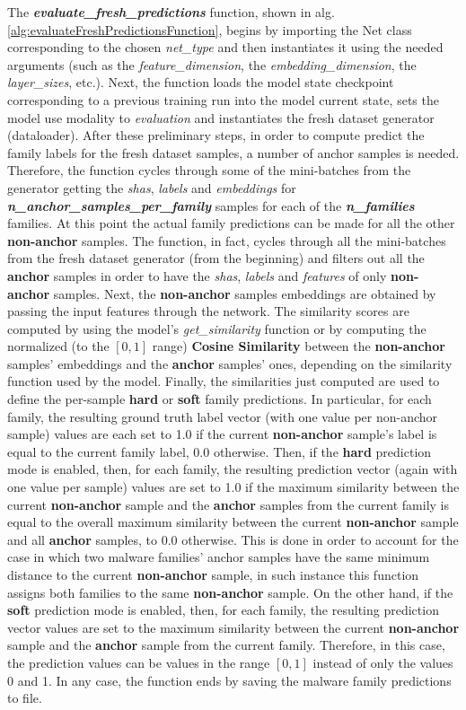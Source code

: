 \documentclass[pdfa%
,cucitura%
]{toptesi}
\begin{document}
The \textbf{\textit{evaluate\_fresh\_predictions}} function, shown in alg. \ref{alg:evaluateFreshPredictionsFunction}, begins by importing the Net class corresponding to the chosen \textit{net\_type} and then instantiates it using the needed arguments (such as the \textit{feature\_dimension}, the \textit{embedding\_dimension}, the \textit{layer\_sizes}, etc.). Next, the function loads the model state checkpoint corresponding to a previous training run into the model current state, sets the model use modality to \textit{evaluation} and instantiates the fresh dataset generator (dataloader). After these preliminary steps, in order to compute predict the family labels for the fresh dataset samples, a number of anchor samples is needed. Therefore, the function cycles through some of the mini-batches from the generator getting the \textit{shas}, \textit{labels} and \textit{embeddings} for \textbf{\textit{n\_anchor\_samples\_per\_family}} samples for each of the \textbf{\textit{n\_families}} families. At this point the actual family predictions can be made for all the other \textbf{non-anchor} samples. The function, in fact, cycles through all the mini-batches from the fresh dataset generator (from the beginning) and filters out all the \textbf{anchor} samples in order to have the \textit{shas}, \textit{labels} and \textit{features} of only \textbf{non-anchor} samples. Next, the \textbf{non-anchor} samples embeddings are obtained by passing the input features through the network. The similarity scores are computed by using the model's \textit{get\_similarity} function or by computing the normalized (to the $[0,1]$ range) \textbf{Cosine Similarity} between the \textbf{non-anchor} samples' embeddings and the \textbf{anchor} samples' ones, depending on the similarity function used by the model. Finally, the similarities just computed are used to define the per-sample \textbf{hard} or \textbf{soft} family predictions. In particular, for each family, the resulting ground truth label vector (with one value per non-anchor sample) values are each set to 1.0 if the current \textbf{non-anchor} sample's label is equal to the current family label, 0.0 otherwise. Then, if the \textbf{hard} prediction mode is enabled, then, for each family, the resulting prediction vector (again with one value per sample) values are set to 1.0 if the maximum similarity between the current \textbf{non-anchor} sample and the \textbf{anchor} samples from the current family is equal to the overall maximum similarity between the current \textbf{non-anchor} sample and all \textbf{anchor} samples, to 0.0 otherwise. This is done in order to account for the case in which two malware families' anchor samples have the same minimum distance to the current \textbf{non-anchor} sample, in such instance this function assigns both families to the same \textbf{non-anchor} sample. On the other hand, if the \textbf{soft} prediction mode is enabled, then, for each family, the resulting prediction vector values are set to the maximum similarity between the current \textbf{non-anchor} sample and the \textbf{anchor} sample from the current family. Therefore, in this case, the prediction values can be values in the range $[0,1]$ instead of only the values 0 and 1. In any case, the function ends by saving the malware family predictions to file.
\end{document}
